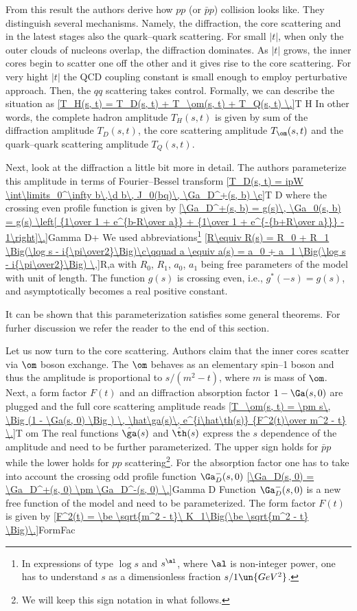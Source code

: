 From this result the authors derive how $pp$ (or $\bar pp$) collision looks like. They distinguish several mechanisms. Namely, the diffraction, the core scattering and in the latest stages also the quark--quark scattering. For small $|t|$, when only the outer clouds of nucleons overlap, the diffraction dominates. As $|t|$ grows, the inner cores begin to scatter one off the other and it gives rise to the core scattering. For very hight $|t|$ the QCD coupling constant is small enough to employ perturbative approach. Then, the $qq$ scattering takes control. Formally, we can describe the situation as
\eqref{T_H(s, t) = T_D(s, t) + T_\om(s, t) + T_Q(s, t) \.}{T H}
In other words, the complete hadron amplitude $T_H(s, t)$ is given by sum of the diffraction amplitude $T_D(s, t)$, the core scattering amplitude $T_\om(s, t)$ and the quark--quark scattering amplitude $T_Q(s, t)$.

Next, look at the diffraction a little bit more in detail. The authors parameterize this amplitude in terms of Fourier--Bessel transform
\eqref{T_D(s, t) = ipW \int\limits_0^\infty b\,\d b\, J_0(bq)\, \Ga_D^+(s, b) \c}{T D}
where the crossing even profile function is given by
\eqref{\Ga_D^+(s, b) = g(s)\, \Ga_0(s, b) = g(s) \left[ {1\over 1 + e^{b-R\over a}} + {1\over 1 + e^{-{b+R\over a}}} - 1\right]\.}{Gamma D+}
We used abbreviations\footnote{In expressions of type $\log s$ and $s^{\al}$, where $\al$ is non-integer power, one has to understand $s$ as a dimensionless fraction $s/1\un{GeV^2}$.}
\eqref{R\equiv R(s) = R_0 + R_1 \Big(\log s - i{\pi\over2}\Big)\c\qquad a \equiv a(s) = a_0 + a_1 \Big(\log s - i{\pi\over2}\Big) \,}{R,a}
with $R_0$, $R_1$, $a_0$, $a_1$ being free parameters of the model with unit of length. The function $g(s)$ is crossing even, i.e., $g^*(-s) = g(s)$, and asymptotically becomes a real positive constant.

It can be shown that this parameterization satisfies some general theorems. For furher discussion we refer the reader to the end of this section.  

Let us now turn to the core scattering. Authors claim that the inner cores scatter via $\om$ boson exchange. The $\om$ behaves as an elementary spin--1 boson and thus the amplitude is proportional to $s/(m^2 - t)$, where $m$ is mass of $\om$. Next, a form factor $F(t)$ and an diffraction absorption factor $1 - \Ga(s, 0)$ are plugged and the full core scattering amplitude reads
\eqref{T_\om(s, t) = \pm s\, \Big (1 - \Ga(s, 0) \Big ) \, \hat\ga(s)\, e^{i\hat\th(s)}  {F^2(t)\over m^2 - t} \.}{T om}
The real functions $\hat\ga(s)$ and $\hat\th(s)$ express the $s$ dependence of the amplitude and need to be further parameterized. The upper sign holds for $\bar pp$ while the lower holds for $pp$ scattering\footnote{We will keep this sign notation in what follows.}. For the absorption factor one has to take into account the crossing odd profile function $\Ga_D^-(s, 0)$
\eqref{\Ga_D(s, 0) = \Ga_D^+(s, 0) \pm \Ga_D^-(s, 0) \.}{Gamma D}
Function $\Ga_D^-(s, 0)$ is a new free function of the model and need to be parameterized. The form factor $F(t)$ is given by
\eqref{F^2(t) = \be \sqrt{m^2 - t}\ K_1\Big(\be \sqrt{m^2 - t} \Big)\.}{FormFac}

